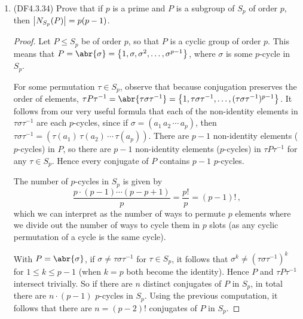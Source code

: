 \documentclass[11pt]{article}
\newcommand{\cbr}[1]{\left\{#1\right\}}
\begin{document}
\begin{enumerate}
\begin{proof}
      Then let $\abs{g} = m$, and note that because $\abs{G}$ is odd, it follows that $m$ is odd as well (since $m = \abs{\abr{g}}$ divides $ \abs{G}$). Then $(xg)^m = xg^m = x$, so that $xg(xg)^{m-1}= x \iff (xg)^{m-1} = g^{-1} = g^{m-1}$. Then \[x = (xg)^m = (xg)^{m-1}xg = g^{-1}xg,\] so that $gx = xg$, and because $xg = gx^{-1}$, we have $gx =  gx^{-1}$, which implies $x = x^{-1}$, meaning $x^2 = 1$. But $x\in G$, meaning that $\abs{x}$ must be odd (since $\abs{x} = \abs{\abr{x}}$ divides $\abs{G}$). This forces $x = 1$, which is in contradiction to the assumption that $x$ was a non-identity element, so the assumption that $x$ was conjugate to $x^{-1}$ cannot hold. 

      Hence for any non-identity element $x\in G$, we have that $x$ and $x^{-1}$ are not conjugate in $G$.
    \end{proof}
    \item (DF4.3.34) Prove that if $p$ is a prime and $P$ is a subgroup of $S_p$ of order $p$, then $\abs{N_{S_p}(P)} = p(p-1)$.
    \begin{proof}
      Let $P\leq S_p$ be of order $p$, so that $P$ is a cyclic group of order $p$. This means that $P = \abr{\sigma} = \cbr{1, \sigma, \sigma^2, \dots, \sigma^{p-1}}$, where $\sigma$ is some $p$-cycle in $S_p$.
      
      For some permutation $\tau\in S_p$, observe that because conjugation preserves the order of elements, $\tau P \tau^{-1} = \abr{\tau\sigma\tau^{-1}} = \cbr{1, \tau\sigma\tau^{-1}, \dots, (\tau\sigma\tau^{-1})^{p-1}}$. It follows from our very useful formula that each of the non-identity elements in $\tau\sigma\tau^{-1}$ are each $p$-cycles, since if $\sigma = (a_1 \, a_2 \, \cdots \, a_p)$, then $\tau\sigma\tau^{-1} = (\tau(a_1) \, \tau(a_2) \, \cdots \, \tau(a_p))$. There are $p-1$ non-identity elements ($p$-cycles) in $P$, so there are $p-1$ non-identity elements ($p$-cycles) in $\tau P \tau^{-1}$ for any $\tau\in S_p$. Hence every conjugate of $P$ contains $p-1$ $p$-cycles.

      The number of $p$-cycles in $S_p$ is given by \[\frac{p\cdot(p-1)\cdots (p-p+1)}{p} = \frac{p!}{p} = (p-1)!\,,\] which we can interpret as the number of ways to permute $p$ elements where we divide out the number of ways to cycle them in $p$ slots (as any cyclic permutation of a cycle is the same cycle).

      With $P =\abr{\sigma}$, if $\sigma \neq \tau \sigma \tau^{-1}$ for $\tau\in S_p$, it follows that $\sigma^k \neq (\tau \sigma \tau^{-1})^k$ for $1\leq k \leq p-1$ (when $k = p$ both become the identity). Hence $P$ and $\tau P\tau^{-1}$ intersect trivially. So if there are $n$ distinct conjugates of $P$ in $S_p$, in total there are $n\cdot (p-1)$ $p$-cycles in $S_p$. Using the previous computation, it follows that there are $n = (p-2)!$ conjugates of $P$ in $S_p$. 
      

\end{proof}
\end{enumerate}
\end{document}
